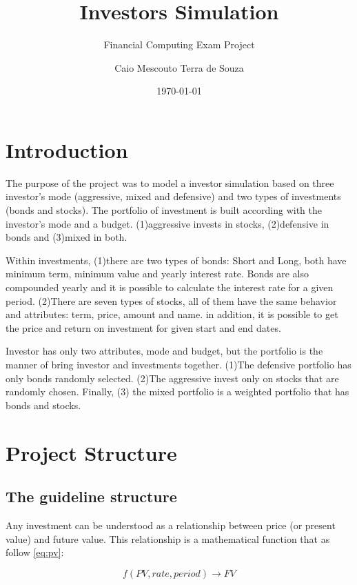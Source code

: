 \documentclass[
  11pt,
]{article}
\title{Investors Simulation}
\subtitle{Financial Computing Exam Project}
\author{Caio Mescouto Terra de Souza}
\date{\today}
\begin{document}
\maketitle

\hypertarget{introduction}{%
\section{Introduction}\label{introduction}}

The purpose of the project was to model a investor simulation based on three investor's mode (aggressive, mixed and defensive) and two types of investments (bonds and stocks). The portfolio of investment is built according with the investor's mode and a budget. (1)aggressive invests in stocks, (2)defensive in bonds and (3)mixed in both.

Within investments, (1)there are two types of bonds: Short and Long, both have minimum term, minimum value and yearly interest rate. Bonds are also compounded yearly and it is possible to calculate the interest rate for a given period. (2)There are seven types of stocks, all of them have the same behavior and attributes: term, price, amount and name. in addition, it is possible to get the price and return on investment for given start and end dates.

Investor has only two attributes, mode and budget, but the portfolio is the manner of bring investor and investments together. (1)The defensive portfolio has only bonds randomly selected. (2)The aggressive invest only on stocks that are randomly chosen. Finally, (3) the mixed portfolio is a weighted portfolio that has bonds and stocks.

\hypertarget{project-structure}{%
\section{Project Structure}\label{project-structure}}

\hypertarget{the-guideline-structure}{%
\subsection{The guideline structure}\label{the-guideline-structure}}

Any investment can be understood as a relationship between price (or present value) and future value. This relationship is a mathematical function that as follow \eqref{eq:pv}:

\begin{equation}
f(PV, rate, period)\rightarrow FV
\label{eq:pv}
\end{equation}
\end{document}
